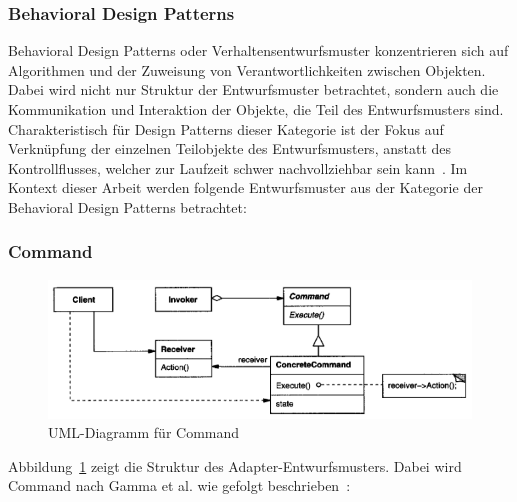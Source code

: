 \subsubsection{Behavioral Design Patterns}

Behavioral Design Patterns oder Verhaltensentwurfsmuster konzentrieren sich auf Algorithmen und der Zuweisung von Verantwortlichkeiten zwischen Objekten\cite[S. 221]{gamma1994design}.
Dabei wird nicht nur Struktur der Entwurfsmuster betrachtet, sondern auch die Kommunikation und Interaktion der Objekte, die Teil des Entwurfsmusters sind. Charakteristisch für Design Patterns dieser Kategorie ist der Fokus auf Verknüpfung der einzelnen Teilobjekte des Entwurfsmusters,
anstatt des Kontrollflusses, welcher zur Laufzeit schwer nachvollziehbar sein kann~\cite[S. 221]{gamma1994design}.
Im Kontext dieser Arbeit werden folgende Entwurfsmuster aus der Kategorie der Behavioral Design Patterns betrachtet:

\subsubsection{Command}

\begin{figure}[h]
    \centering
    \includegraphics[scale=0.75]{figures/command.png}
    \caption{UML-Diagramm für Command}
    \label{fig:command}
\end{figure}

Abbildung~\ref{fig:command} zeigt die Struktur des Adapter-Entwurfsmusters. 
Dabei wird Command nach Gamma et al. wie gefolgt beschrieben~\cite[S. 236]{gamma1994design}:

